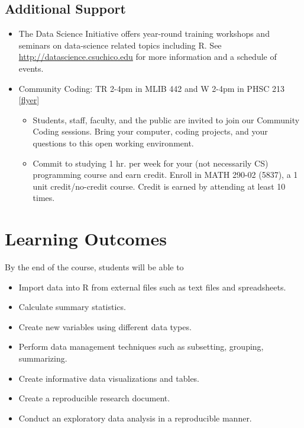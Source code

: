 \documentclass[11pt,]{article}
\providecommand{\tightlist}{%
  \setlength{\itemsep}{0pt}\setlength{\parskip}{0pt}}
\begin{document}
\hypertarget{additional-support}{%
\subsection{Additional Support}\label{additional-support}}

\begin{itemize}
\tightlist
\item
  The Data Science Initiative offers year-round training workshops and
  seminars on data-science related topics including R. See
  \url{http://datascience.csuchico.edu} for more information and a
  schedule of events.
\item
  Community Coding: TR 2-4pm in MLIB 442 and W 2-4pm in PHSC 213
  \href{cc_flyer.pdf}{{[}flyer{]}}

  \begin{itemize}
  \tightlist
  \item
    Students, staff, faculty, and the public are invited to join our
    Community Coding sessions. Bring your computer, coding projects, and
    your questions to this open working environment.
  \item
    Commit to studying 1 hr. per week for your (not necessarily CS)
    programming course and earn credit. Enroll in MATH 290-02 (5837), a
    1 unit credit/no-credit course. Credit is earned by attending at
    least 10 times.
  \end{itemize}
\end{itemize}

\hypertarget{learning-outcomes}{%
\section{Learning Outcomes}\label{learning-outcomes}}

By the end of the course, students will be able to

\begin{itemize}
\tightlist
\item
  Import data into R from external files such as text files and
  spreadsheets.
\item
  Calculate summary statistics.
\item
  Create new variables using different data types.
\item
  Perform data management techniques such as subsetting, grouping,
  summarizing.
\item
  Create informative data visualizations and tables.
\item
  Create a reproducible research document.
\item
  Conduct an exploratory data analysis in a reproducible manner.
\end{itemize}
\end{document}
